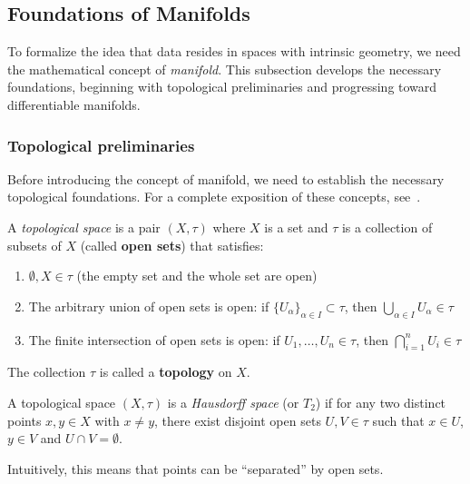 \subsection{Foundations of Manifolds}\label{subsec:fundamentos_variedades}

To formalize the idea that data resides in spaces with intrinsic geometry, we need the mathematical concept of \textit{manifold}. This subsection develops the necessary foundations, beginning with topological preliminaries and progressing toward differentiable manifolds.

\subsubsection{Topological preliminaries}\label{subsubsec:preliminares_topologicos}

Before introducing the concept of manifold, we need to establish the necessary topological foundations. For a complete exposition of these concepts, see~\citet{munkres2000topology}.

\begin{definition}\label{def:espacio_topologico}
A \textit{topological space} is a pair $(X, \tau)$ where $X$ is a set and $\tau$ is a collection of subsets of $X$ (called \textbf{open sets}) that satisfies:
\begin{enumerate}
	\item $\emptyset, X \in \tau$ (the empty set and the whole set are open)
	\item The arbitrary union of open sets is open: if $\{U_\alpha\}_{\alpha \in I} \subset \tau$, then $\bigcup_{\alpha \in I} U_\alpha \in \tau$
	\item The finite intersection of open sets is open: if $U_1, \ldots, U_n \in \tau$, then $\bigcap_{i=1}^n U_i \in \tau$
\end{enumerate}
The collection $\tau$ is called a \textbf{topology} on $X$.
\end{definition}

\begin{definition}\label{def:espacio_hausdorff}
A topological space $(X, \tau)$ is a \textit{Hausdorff space} (or $T_2$) if for any two distinct points $x, y \in X$ with $x \neq y$, there exist disjoint open sets $U, V \in \tau$ such that $x \in U$, $y \in V$ and $U \cap V = \emptyset$.

Intuitively, this means that points can be ``separated'' by open sets.
\end{definition}

